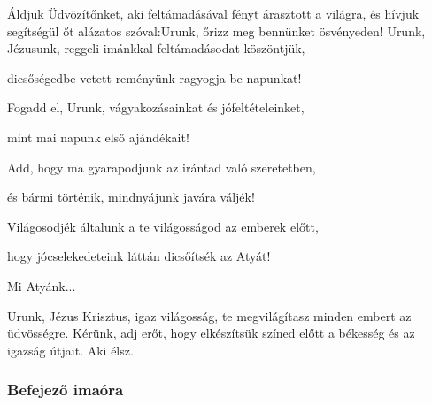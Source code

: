 \documentclass[twoside]{article}
\begin{document}





\begin{preces}{Áldjuk Üdvözítőnket, aki feltámadásával fényt árasztott a világra, és hívjuk
    segítségül őt alázatos szóval:}{Urunk, őrizz meg bennünket ösvényeden!}
  Urunk, Jézusunk, reggeli imánkkal feltámadásodat köszöntjük,

  \reddash dicsőségedbe vetett reményünk ragyogja be napunkat!

  Fogadd el, Urunk, vágyakozásainkat és jófeltételeinket,

  \reddash mint mai napunk első ajándékait!

  Add, hogy ma gyarapodjunk az irántad való szeretetben,

  \reddash és bármi történik, mindnyájunk javára váljék!

  Világosodjék általunk a te világosságod az emberek előtt,

  \reddash hogy jócselekedeteink láttán dicsőítsék az Atyát!
\end{preces}
Mi Atyánk...


Urunk, Jézus Krisztus, igaz világosság, te megvilágítasz minden embert az üdvösségre. Kérünk, adj
erőt, hogy elkészítsük színed előtt a békesség és az igazság útjait. Aki élsz.

\label{f3/Compl}

\subsubsection*{Befejező imaóra}



\end{document}
